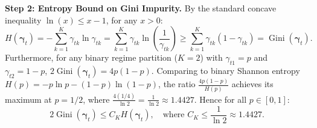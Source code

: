 \textbf{Step 2: Entropy Bound on Gini Impurity.}
By the standard concave inequality $\ln(x) \le x - 1$, for any $x > 0$:
\begin{equation}
    H(\boldsymbol{\gamma}_t) = -\sum_{k=1}^K \gamma_{tk} \ln \gamma_{tk} = \sum_{k=1}^K \gamma_{tk} \ln\left(\frac{1}{\gamma_{tk}}\right) \ge \sum_{k=1}^K \gamma_{tk} (1 - \gamma_{tk}) = \operatorname{Gini}(\boldsymbol{\gamma}_t).
\end{equation}
Furthermore, for any binary regime partition ($K=2$) with $\gamma_{t1} = p$ and $\gamma_{t2} = 1-p$, $2 \operatorname{Gini}(\boldsymbol{\gamma}_t) = 4p(1-p)$. Comparing to binary Shannon entropy $H(p) = -p\ln p - (1-p)\ln(1-p)$, the ratio $\frac{4p(1-p)}{H(p)}$ achieves its maximum at $p = 1/2$, where $\frac{4(1/4)}{\ln 2} = \frac{1}{\ln 2} \approx 1.4427$. Hence for all $p \in [0, 1]$:
\begin{equation}
    2 \operatorname{Gini}(\boldsymbol{\gamma}_t) \le C_K H(\boldsymbol{\gamma}_t), \quad \text{where } C_K \le \frac{1}{\ln 2} \approx 1.4427.
\end{equation}

